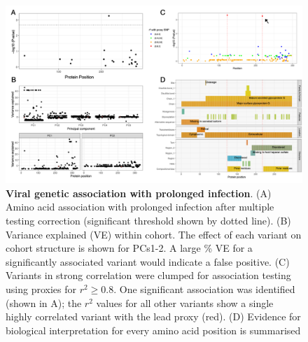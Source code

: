 \documentclass{article} %
\begin{document}
\begin{figure}[ht] \hspace{-0.5cm} 
    \includegraphics[scale=0.85]{f3}
	\caption{\textbf{Viral genetic association with prolonged infection}. (A) Amino acid association with prolonged infection after multiple testing correction (significant threshold shown by dotted line). (B) Variance explained (VE) within cohort. The effect of each variant on cohort structure is shown for PCs1-2. A large \% VE for a significantly associated variant would indicate a false positive. (C) Variants in strong correlation were clumped for association testing using proxies for $r^2 \ge 0.8$. One significant association was identified (shown in A); the $r^2$ values for all other variants show a single highly correlated variant with the lead proxy (red). 
	(D) Evidence for biological interpretation for every amino acid position is summarised}
	\label{fig:3}
\end{figure}
\clearpage
\end{document}
